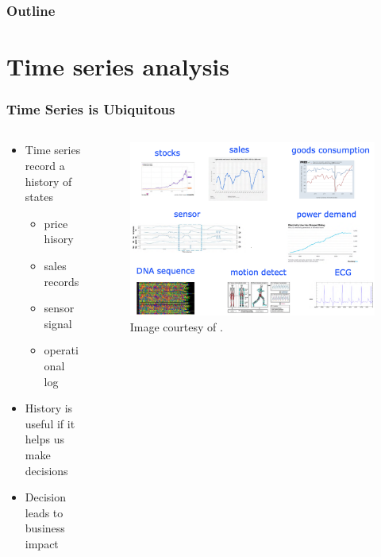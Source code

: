 \documentclass[aspectratio=169,xcolor=x11names,table]{beamer}
\begin{document}
\begin{frame}
	\frametitle{Outline}
	\tableofcontents[hideallsubsections]
\end{frame}

\section{Time series analysis}

\begin{frame}
	\frametitle{Time Series is Ubiquitous}
	\begin{columns}
		\begin{column}{0.4\linewidth}
			\begin{itemize}
				\item Time series record a history of states
					\begin{itemize}
						\item price hisory
						\item sales records
						\item sensor signal
						\item operational log
					\end{itemize}
				\item History is useful if it helps us make decisions
				\item Decision leads to business impact
			\end{itemize}
		\end{column}
		\hfill
		\begin{column}{0.6\linewidth}
			\begin{figure}
				\centering
				\includegraphics[width=\columnwidth]{time_series}
				\tiny{Image courtesy of \cite{wen2022robust}.}
			\end{figure}
		\end{column}
	\end{columns}
\end{frame}
\end{document}
